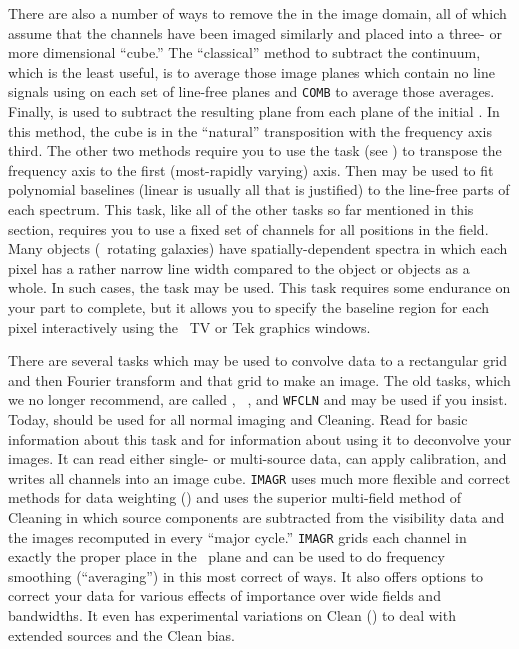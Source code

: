      There are also a number of ways to remove the  in
the image domain, all of which assume that the channels have been
imaged similarly and placed into a three- or more dimensional
``cube.''  The ``classical'' method to subtract the continuum, which
is the least useful, is to average those image planes which contain no
line signals using {\tt {}} on each set of line-free planes
and {\tt COMB} to average those averages.  Finally, {\tt {}}
is used to subtract the resulting plane from each plane of the initial
.  In this method, the cube is in the ``natural''
transposition with the frequency axis third.  The other two methods
require you to use the task {\tt {}} (see )
to transpose the frequency axis to the first (most-rapidly varying)
axis.  Then {\tt {}} may be used to fit polynomial baselines
(linear is usually all that is justified) to the line-free parts of
each spectrum.  This task, like all of the other tasks so far
mentioned in this section, requires you to use a fixed set of channels
for all positions in the field.  Many objects (\eg\ rotating galaxies)
have spatially-dependent spectra in which each pixel has a rather
narrow line width compared to the object or objects as a whole.  In
such cases, the task {\tt {}} may be used.  This task
requires some endurance on your part to complete, but it allows you to
specify the baseline region for each pixel interactively using the
\AIPS\ TV or Tek graphics windows.


     There are several tasks which may be used to convolve
 data to a rectangular grid and then Fourier
transform and  that grid to make an image.  The old tasks,
which we no longer recommend, are called {\tt {}}, {\tt
{}}, and {\tt WFCLN} and may be used if you insist.  Today,
{\tt {}} should be used for all normal imaging and Cleaning.
Read  for basic information about this task and 
for information about using it to deconvolve your images.  It can read
either single- or multi-source data, can apply calibration, and writes
all channels into an image cube.  {\tt IMAGR} uses much more flexible
and correct methods for data weighting () and uses the
superior multi-field method of Cleaning in which source components are
subtracted from the visibility data and the images recomputed in every
``major cycle.''  {\tt IMAGR} grids each channel in exactly the proper
place in the \uv\ plane and can be used to do frequency smoothing
(``averaging'') in this most correct of ways.  It also offers options
to correct your data for various effects of importance over wide
fields and bandwidths.  It even has experimental variations on Clean
() to deal with extended sources and the Clean bias.

